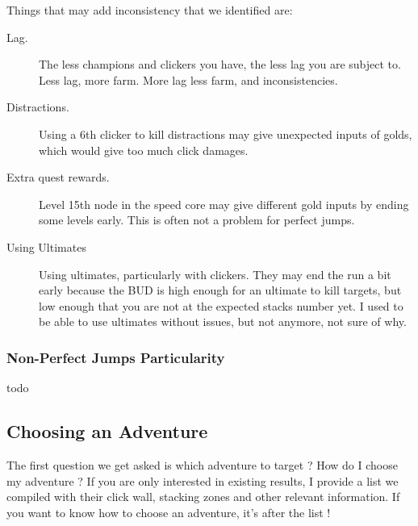 \documentclass{article}
\begin{document}
Things that may add inconsistency that we identified are:
\begin{description}
    \item[Lag.]
    The less champions and clickers you have, the less lag you are subject to.
    Less lag, more farm.
    More lag less farm, and inconsistencies.
    
    \item[Distractions.] Using a 6th clicker to kill distractions may give unexpected inputs of golds, which would give too much click damages.
    
    \item[Extra quest rewards.] Level 15th node in the speed core may give different gold inputs by ending some levels early.
    This is often not a problem for perfect jumps.
    
    \item[Using Ultimates] Using ultimates, particularly with clickers.
    They may end the run a bit early because the BUD is high enough for an ultimate to kill targets, but low enough that you are not at the expected stacks number yet.
    I used to be able to use ultimates without issues, but not anymore, not sure of why.
\end{description}


\subsubsection{Non-Perfect Jumps Particularity}
\label{sec:nonPerfectJumps}

todo

\subsection{Choosing an Adventure}

The first question we get asked is which adventure to target ?
How do I choose my adventure ?
If you are only interested in existing results, I provide a list we compiled with their click wall, stacking zones and other relevant information.
If you want to know how to choose an adventure, it's after the list !
\end{document}
